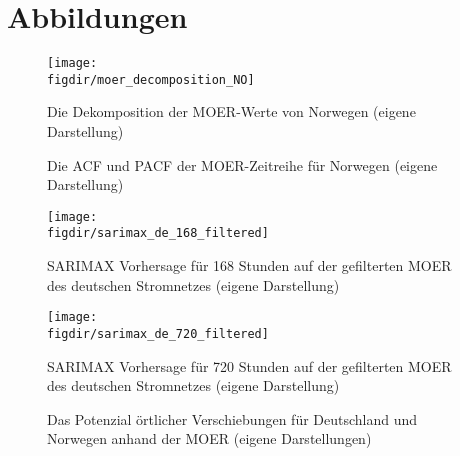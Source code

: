 \chapter{Abbildungen}\label{CAP:append-figures}
\begin{figure}
    \caption[Dekomposition der MOER Norwegens]{Die Dekomposition der MOER-Werte von Norwegen (eigene Darstellung)}
    {\texttt{[image: \\figdir/moer\_decomposition\_NO]}}
    \label{FIG:moer_decomposition_NO}
\end{figure}

\begin{figure}
    \centering
    \qquad
    \caption[ACF und PACF der MOER von Norwegen]{Die ACF und PACF der MOER-Zeitreihe für Norwegen (eigene Darstellung)}%
    \label{FIG:acf_pacf_moer_no}%
\end{figure}

\begin{figure}
    \caption[SARIMAX 168h Vorhersage MOER Deutschland gefiltert]{SARIMAX Vorhersage für 168 Stunden auf der gefilterten MOER des deutschen Stromnetzes (eigene Darstellung)}
    {\texttt{[image: \\figdir/sarimax\_de\_168\_filtered]}}
    \label{FIG:sarimax_de_168_filtered}
\end{figure}
\begin{figure}
    \caption[SARIMAX 72h Vorhersage MOER Deutschland gefiltert]{SARIMAX Vorhersage für 720 Stunden auf der gefilterten MOER des deutschen Stromnetzes (eigene Darstellung)}
    {\texttt{[image: \\figdir/sarimax\_de\_720\_filtered]}}
    \label{FIG:sarimax_de_720_filtered}
\end{figure}

\begin{figure}
    \centering
    \qquad
    \qquad
    \caption[Potenzial örtlicher Verschiebungen zwischen Deutschland und Norwegen]{Das Potenzial örtlicher Verschiebungen für Deutschland und Norwegen anhand der MOER (eigene Darstellungen)}%
    \label{FIG:location-shifting-potential}%
\end{figure}



